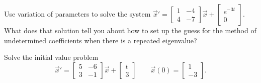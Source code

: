 \documentclass{ximera}
\begin{document}
\begin{exercise}
    \begin{tasks} 
        \task Use variation of parameters to solve the system $\vec{x}'=\begin{bmatrix}1&-4\\ 4&-7\end{bmatrix}\vec{x}+\displaystyle \begin{bmatrix} e^{-3t} \\ 0 \end{bmatrix}$.
        \task What does that solution tell you about how to set up the guess for the method of undetermined coefficients when there is a repeated eigenvalue?
    \end{tasks}
\end{exercise}

\begin{exercise}
Solve the initial value problem
\[ 
    {\vec{x}}' = 
    \begin{bmatrix} 
        5 & -6 \\ 
        3 & -1 
    \end{bmatrix}
    \vec{x} + 
    \begin{bmatrix} 
        t \\ 
        3 
    \end{bmatrix} 
    \qquad \vec{x}(0) = 
    \begin{bmatrix} 
        1 \\ 
        -3 
    \end{bmatrix}. 
\]
\end{exercise}
\end{document}
